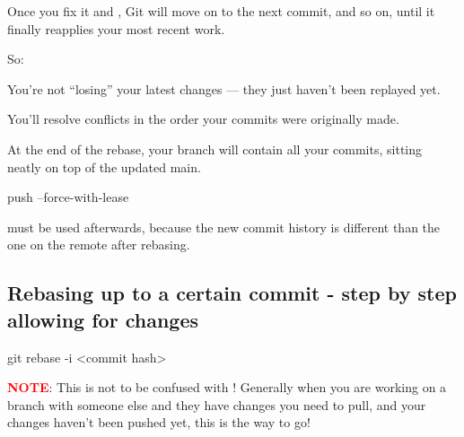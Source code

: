 Once you fix it and , Git will move on to the next commit, and so on, until it finally reapplies your most recent work.

So:

You’re not “losing” your latest changes — they just haven’t been replayed yet.

You’ll resolve conflicts in the order your commits were originally made.

At the end of the rebase, your branch will contain all your commits, sitting neatly on top of the updated main.

\begin{gitBashBox}
push --force-with-lease 
\end{gitBashBox}
must be used afterwards, because the new commit history is different than the one on the remote after rebasing.

\subsection{Rebasing up to a certain commit - step by step allowing for changes}
\begin{gitBashBox}
git rebase -i <commit hash>    
\end{gitBashBox}

\begin{tcolorbox}[infoBox]
        \textcolor{red}{\textbf{NOTE}}: This is not to be confused with ! Generally when you are working on a branch with someone else and they
have changes you need to pull, and your changes haven't been pushed yet, this is the way to go!
\end{tcolorbox}


